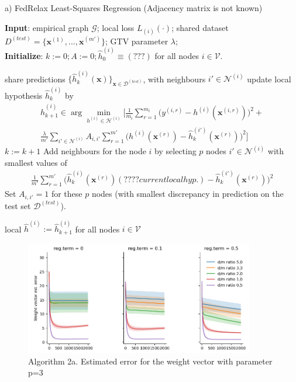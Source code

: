 \documentclass{article}
\newcommand{\graph}{\mathcal{G}}
\begin{document}
\begin{algorithm}[htbp]
	\caption{a) FedRelax Least-Squares Regression (Adjacency matrix is not known)}
	\label{alg_X_param}
	{\bf Input}: empirical graph $\graph$; 
	local loss $L_{(i)}{(\cdot)}$; shared dataset $D^{(test)} = \{\mathbf{x}^{(1)}, ..., \mathbf{x}^{(m')}\}$; GTV parameter $\lambda$; \\
	{\bf Initialize}: $k:=0; A:=0; \widehat{h}_{0}^{(i)} \!\equiv\! (???)$ for all nodes $i \in \mathcal{V}$.
	\begin{algorithmic}[1]
		\State share predictions $\{\widehat{h}_{k}^{(i)}(\mathbf{x})\}_{\mathbf{x} \in \mathcal{D}^(test)}$, 
		with neighbours $i' \in \mathcal{N}^{(i)}$ 
		\State update local hypothesis $\widehat{h}_{k}^{(i)}$ by
            \begin{multline*}
            \widehat{h}_{k+1}^{(i)} \in  \arg \min_{h^{(i)} \in \mathcal{H}^{(i)}} 
            \biggl[ \frac{1}{m_i}  \sum_{r=1}^{m_i} \biggl( y^{(i,r)} - h^{(i)}(\mathbf{x}^{(i,r)})  \biggr)^2 + \\
            \frac{\lambda}{m'} \sum_{i' \in \mathcal{N}^{(i)}}A_{i,i'}\sum_{r=1}^{m'} \biggl( h^{(i)}(\mathbf{x}^{(r)}) - \widehat{h}_{k}^{(i')}(\mathbf{x}^{(r)}) \biggr)^2 \biggr]
            \end{multline*}
		\EndFor
		\State $k := k+1$
        \State Add neighbours for the node $i$ by selecting $p$ nodes $i' \in \mathcal{N}^{(i)}$ with smallest values of
             \begin{align}
                \frac{1}{m'} \sum_{r=1}^{m'} \biggl( \widehat{h}_{k}^{(i)}(\mathbf{x}^{(r)}) (???? current local hyp.) - \widehat{h}_{k}^{(i')}(\mathbf{x}^{(r)}) \biggr)^2 
             \end{align}
        \State Set $A_{i,i'} = 1$ for these $p$ nodes (with smallest discrepancy in prediction on the test set $\mathcal{D}^{(test)}$).
        
        \EndFor
		\EndWhile
			  \Ensure local $\widehat{h}^{(i)} := \widehat{h}_{k+1}^{(i)}$ for all nodes $i \in \mathcal{V}$
	\end{algorithmic}
\end{algorithm}

\begin{figure}[h]
\includegraphics[width=10cm]{linreg_nneib_3.png}
\caption{Algorithm 2a. Estimated error for the weight vector with parameter p=3}
\end{figure}
\end{document}
